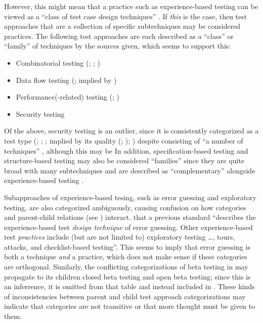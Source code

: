 \ifnotpaper
    \label{classFamilyDiscrep}
    However, this might mean that a practice such as experience-based testing
    can be viewed as a ``class of test case design techniques''
    \citep[p.~4]{IEEE2022}. If \emph{this} is the case, then test approaches
    that are a collection of specific subtechniques may be considered
    practices. The following test approaches are each described as a ``class''
    or ``family'' of techniques by the sources given, which seems to support
    this:
    \begin{itemize}
        \item Combinatorial testing (\citealp[p.~3]{IEEE2022};
              \citeyear[p.~2]{IEEE2021}; \citealp[p.~5-11]{SWEBOK2024})
        \item Data flow testing (\citeyear[p.~3]{IEEE2021};
              implied by \citealp[p.~5-13]{SWEBOK2024})
        \item Performance(-related) testing (\citealp[p.~38]{IEEE2021};
              \perfAsFamily*{})
        \item Security testing \citep[implied by][p.~40]{IEEE2021}
    \end{itemize}
    Of the above, security testing is an outlier, since it is consistently
    categorized as a test type (\citealp[pp.~9, 22, 26--27]{IEEE2022};
    \citeyear[pp.~7, 40, Tab.~A.1]{IEEE2021}; \citeyear[p.~405]{IEEE2017}%
    ; implied by its quality (\citealp{ISO_IEC2023a};
    \citealp[p.~13-4]{SWEBOK2024}); \citealp[p.~53]{Firesmith2015}) despite
    consisting of ``a number of techniques'' \cite[p.~40]{IEEE2021}, although
    this may be  In addition, specification-based
    testing and structure-based testing may also be considered ``families''
    since they are quite broad with many subtechniques and are described as
    ``complementary'' alongside experience-based testing
    \citep[p.~8, Fig.~2]{IEEE2021}.
\fi

Subapproaches of experience-based tesing, such as error guessing and
exploratory testing, are also categorized ambiguously, causing confusion on how
categories and parent-child relations (see ) interact.
 \citet[p.~34\ifnotpaper, emphasis added\fi]{IEEE2022}
 that a previous standard \citeyearpar{IEEE2021}
``describes the experience-based test \emph{design technique} of error
guessing. Other experience-based test \emph{practices} include (but are not
limited to) exploratory testing \dots, tours, attacks, and checklist-based
testing''. This seems to imply that error guessing is both a technique
\emph{and} a practice, which does not make sense if these categories are
orthogonal. \ifnotpaper Similarly, the conflicting categorizations of beta
    testing in  may propagate to its children closed beta
    testing and open beta testing; since this is an inferrence, it is omitted
    from that table and instead included in . \fi These
kinds of inconsistencies between parent and child test approach categorizations
may indicate that categories are not transitive or that more thought must be
given to them.

